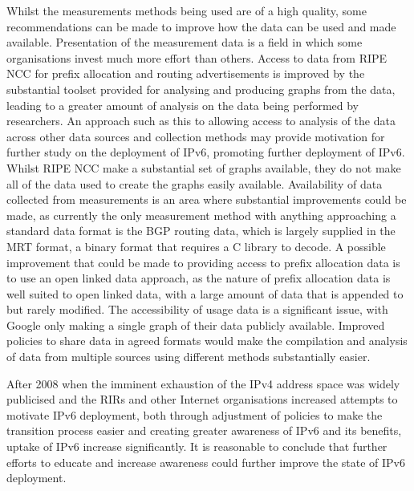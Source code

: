 Whilst the measurements methods being used are of a high quality, some
recommendations can be made to improve how the data can be used and made
available. Presentation of the measurement data is a field in which some
organisations invest much more effort than others. Access to data from RIPE
NCC for prefix allocation and routing
advertisements is improved by the substantial toolset provided for analysing
and producing graphs from the data, leading to a greater amount of analysis on the data
being performed by researchers. An approach such as this to allowing access to
analysis of the data across other data sources and collection methods may
provide motivation for further study on the deployment of IPv6, promoting
further deployment of IPv6. Whilst RIPE NCC make a substantial set of graphs
available, they do not make all of the data used to create the graphs easily
available. Availability of data collected from measurements is an area where
substantial improvements could be made, as currently the only measurement method
with anything approaching a standard data format is the BGP routing data, which
is largely supplied in the MRT format, a binary format that requires a C library
to decode. A possible improvement that could be made to providing access to
prefix allocation data is to use an open linked data approach, as the nature of prefix
allocation data is well suited to open linked data, with a large amount of data
that is appended to but rarely modified. The accessibility of usage data is a
significant issue, with Google only making a single graph of their data publicly
available. Improved policies to share data in agreed formats would make the
compilation and analysis of data from multiple sources using different methods
substantially easier. 

 After 2008 when the imminent exhaustion of the IPv4 address space was
widely publicised and the RIRs and other Internet organisations increased
attempts to motivate IPv6 deployment, both through adjustment of policies to
make the transition process easier and creating greater awareness of IPv6 and
its benefits, uptake of IPv6 increase significantly. It is reasonable to
conclude that further efforts to educate and increase awareness could further
improve the state of IPv6 deployment.

